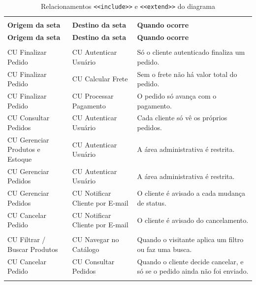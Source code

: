 \documentclass[12pt,a4paper]{article}
\begin{document}
{\setlength{\arrayrulewidth}{0.3pt}\renewcommand{\arraystretch}{1.15}\small
\begin{xltabular}{\textwidth}{>{\raggedright\arraybackslash}p{4.4cm}|>{\raggedright\arraybackslash}p{4.4cm}|>{\raggedright\arraybackslash}X}
\caption{Relacionamentos \texttt{<<include>>} e \texttt{<<extend>>} do diagrama}\\
\toprule{}
\textbf{Origem da seta} & \textbf{Destino da seta} & \textbf{Quando ocorre}\\ \midrule{}
\endfirsthead
{}\toprule{}
\textbf{Origem da seta} & \textbf{Destino da seta} & \textbf{Quando ocorre}\\ \midrule{}
\endhead
\endlastfoot
{}\\ \hline
CU Finalizar Pedido & CU Autenticar Usuário & Só o cliente autenticado finaliza um pedido.\\ \hline
CU Finalizar Pedido & CU Calcular Frete & Sem o frete não há valor total do pedido.\\ \hline
CU Finalizar Pedido & CU Processar Pagamento & O pedido só avança com o pagamento.\\ \hline
CU Consultar Pedidos & CU Autenticar Usuário & Cada cliente só vê os próprios pedidos.\\ \hline
CU Gerenciar Produtos e Estoque & CU Autenticar Usuário & A área administrativa é restrita.\\ \hline
CU Gerenciar Pedidos & CU Autenticar Usuário & A área administrativa é restrita.\\ \hline
CU Gerenciar Pedidos & CU Notificar Cliente por E-mail & O cliente é avisado a cada mudança de status.\\ \hline
CU Cancelar Pedido & CU Notificar Cliente por E-mail & O cliente é avisado do cancelamento.\\ \hline
{}\\ \hline
CU Filtrar / Buscar Produtos & CU Navegar no Catálogo & Quando o visitante aplica um filtro ou faz uma busca.\\ \hline
CU Cancelar Pedido & CU Consultar Pedidos & Quando o cliente decide cancelar, e só se o pedido ainda não foi enviado.\\ \bottomrule
\end{xltabular}}
\end{document}
